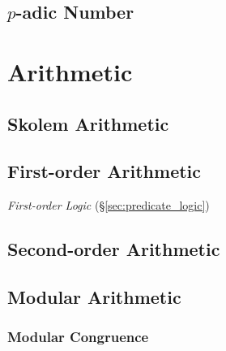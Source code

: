 \subsection{$p$-adic Number}\label{sec:padic_number}



\section{Arithmetic}\label{sec:arithmetic}

\subsection{Skolem Arithmetic}\label{sec:skolem_arithmetic}\cite{skolem23}

\subsection{First-order Arithmetic}\label{sec:firstorder_arithmetic}

\emph{First-order Logic} (\S\ref{sec:predicate_logic})

\subsection{Second-order Arithmetic}\label{sec:second_order_arithmetic}

\subsection{Modular Arithmetic}\label{sec:modular_arithmetic}

\subsubsection{Modular Congruence}\label{sec:modular_congruence}

